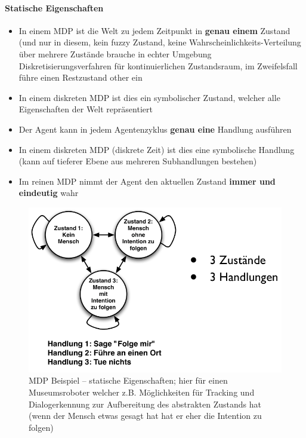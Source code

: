 \paragraph{Statische Eigenschaften}
\begin{itemize}
	\item In einem MDP ist die Welt zu jedem Zeitpunkt in \textbf{genau einem} Zustand (und nur in diesem, kein fuzzy Zustand, keine Wahrscheinlichkeits-Verteilung über mehrere Zustände
	\ita brauche in echter Umgebung Diskretisierungsverfahren für kontinuierlichen Zustandsraum, im Zweifelsfall führe einen Restzustand \glqq other\grqq{} ein
	\item In einem diskreten MDP ist dies ein symbolischer Zustand, welcher alle Eigenschaften der Welt repr\"asentiert
	\item Der Agent kann in jedem Agentenzyklus \textbf{genau eine} Handlung ausf\"uhren
	\item In einem diskreten MDP (diskrete Zeit) ist dies eine symbolische Handlung (kann auf tieferer Ebene aus mehreren Subhandlungen bestehen)
	\item Im reinen MDP nimmt der Agent den aktuellen Zustand \textbf{immer und eindeutig} wahr
\end{itemize}
\begin{figure}[!h]
	\centering
  	\includegraphics[width=0.5\linewidth]{figures/ch07_stat-bsp.png}
	\caption{MDP Beispiel -- statische Eigenschaften; hier für einen Museumsroboter welcher z.B. Möglichkeiten für Tracking und Dialogerkennung zur Aufbereitung des abstrakten Zustands hat (wenn der Mensch etwas gesagt hat hat er eher die Intention zu folgen)}
	\label{fig:ch07:stat-bsp}
\end{figure}
